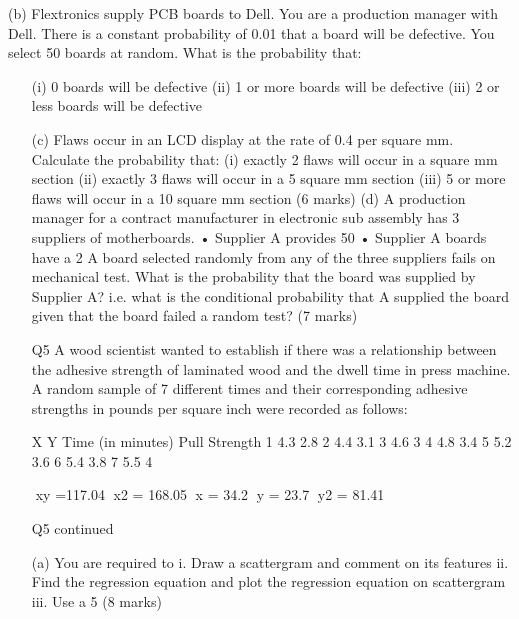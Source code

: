 (b) 	Flextronics supply PCB boards to Dell.  You are a production manager with Dell.  There is a constant probability of 0.01 that a board will be defective.  You select 50 boards at random.  What is the probability that:
\begin{itemize}
\item[(i)]	0 boards will be defective
(ii)	1 or more boards will be defective
(iii)	2 or less boards will be defective			

 

(c)	Flaws occur in an LCD display at the rate of 0.4 per square mm.  Calculate the probability that:
(i)	exactly 2 flaws will occur in a square mm section
(ii)	exactly 3 flaws will occur in a 5 square mm section
(iii)	5 or more flaws will occur in a 10 square mm section
(6 marks)
(d)	A production manager for a contract manufacturer in electronic sub assembly has 3 suppliers of motherboards.  
•	Supplier A provides 50%
•	Supplier A boards have a 2%
A board selected randomly from any of the three suppliers fails on mechanical test.  What is the probability that the board was supplied by Supplier A? i.e. what is the conditional probability that A supplied the board given that the board failed a random test?
(7 marks)


Q5
A wood scientist wanted to establish if there was a relationship between the adhesive strength of laminated wood and the dwell time in press machine. A random sample of 7 different times and their corresponding adhesive strengths in pounds per square inch were recorded as follows:


	X	Y
	Time (in minutes)	Pull Strength
1	4.3	2.8
2	4.4	3.1
3	4.6	3
4	4.8	3.4
5	5.2	3.6
6	5.4	3.8
7	5.5	4
	
	xy =117.04	 x2 = 168.05	 x = 34.2	y = 23.7      y2 = 81.41
 
Q5 continued

(a) 	You are required to 
i.	Draw a scattergram and comment on its features
ii.	Find the regression equation and plot the regression equation on scattergram
iii.	Use a 5%
(8 marks)


\end{itemize}
